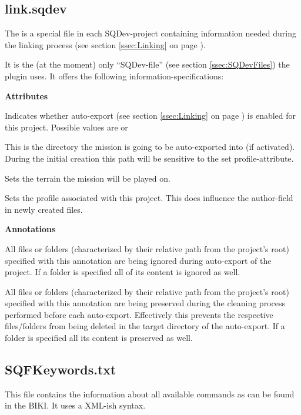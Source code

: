 \documentclass[twoside=false]{scrbook}
\newcommand{\SQDev}{SQDev\xspace}
\newenvironment{options*}{%
	\vspace{3mm}%
	\hrule{}

	\newcommand{\option}[1]{%
		\item \textbf{##1} - \hspace{-1.6mm}%
	}%
	\begin{itemize}%
}{%
	\end{itemize}\hrule%
	\vspace{3mm}%
}
\newenvironment{options}[1][Options]{%
	\needspace{2\baselineskip}
	\textbf{#1}%
	\begin{options*}%
}{%
	\end{options*}%
}
\begin{document}
	
	\subsection{link.sqdev}
	\label{ssec:link.sqdev}
	The  is a special file in each \SQDev-project containing information needed during the linking process (see section \ref{ssec:Linking} on page \pageref{ssec:Linking}).
	
	It is the (at the moment) only “\SQDev-file” (see section \ref{ssec:SQDevFiles}) the plugin uses. It offers the following information-specifications:
	
	\begin{options}[Attributes]
		 Indicates whether auto-export (see section \ref{ssec:Linking} on page \pageref{ssec:Linking}) is enabled for this project. Possible values are  or 
		
		 This is the directory the mission is going to be auto-exported into (if activated). During the initial creation this path will be sensitive to the set profile-attribute.
		
		 Sets the terrain the mission will be played on.
		
		 Sets the profile associated with this project. This does influence the author-field in newly created  files.
	\end{options}
	
	\begin{options}[Annotations]
		 All files or folders (characterized by their relative path from the project's root) specified with this annotation are being ignored during auto-export of the project. If a folder is specified all of its content is ignored as well.
		
		 All files or folders (characterized by their relative path from the project's root) specified with this annotation are being preserved during the cleaning process performed before each auto-export. Effectively this prevents the respective files/folders from being deleted in the target directory of the auto-export. If a folder is specified all its content is preserved as well.
	\end{options}
	
	
	\subsection{SQFKeywords.txt}
	\label{ssec:SQFKeywords.txt}
	This file contains the information about all available commands as can be found in the BIKI. It uses a XML-ish syntax.
	
\end{document}
